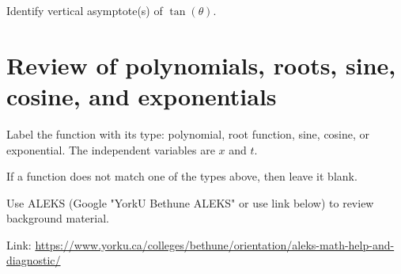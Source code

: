 \documentclass[../main.tex]{subfiles}
\begin{document}
\begin{example}
  Identify vertical asymptote(s) of \(\tan(\theta)\).
\end{example}
\clearpage

\section{Review of polynomials, roots, sine, cosine, and exponentials}

\begin{example}
  Label the function with its type: polynomial, root function, sine, cosine, or exponential. The independent variables are \(x\) and \(t\). %

  \begin{figure}[h!]  %
    \centering
  \end{figure}
\end{example}
If a function does not match one of the types above, then leave it blank.


Use ALEKS (Google "YorkU Bethune ALEKS" or use link below) to review background material.

Link: \url{https://www.yorku.ca/colleges/bethune/orientation/aleks-math-help-and-diagnostic/}
\end{document}
